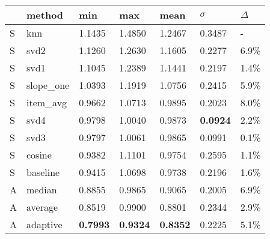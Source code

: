 \begin{table}
  \begin{tabular*}{0.9\textwidth}{ l p{1.8cm} l l l l l }
    \hline
    { } & method & min & max & mean & $\sigma$ & $\Delta$ \\
    \hline
    S & knn       	  & 1.1435	& 1.4850	& 1.2467	& 0.3487 & - \\
    S & svd2          & 1.1260	& 1.2630	& 1.1605	& 0.2277 & 6.9\% \\
    S & svd1          & 1.1045	& 1.2389	& 1.1441	& 0.2197 & 1.4\% \\
    S & slope\_one    & 1.0393	& 1.1919	& 1.0756	& 0.2415 & 5.9\% \\
    S & item\_avg     & 0.9662	& 1.0713	& 0.9895	& 0.2023 & 8.0\% \\
    S & svd4          & 0.9798	& 1.0040	& 0.9873	& \textbf{0.0924} & 2.2\% \\
    S & svd3          & 0.9797	& 1.0061	& 0.9865	& 0.0991 & 0.1\% \\
    S & cosine   	    & 0.9382	& 1.1101	& 0.9754	& 0.2595 & 1.1\% \\
    S & baseline       & 0.9415	& 1.0698	& 0.9738	& 0.2196 & 1.6\% \\
    \hline            
    A & median    	  & 0.8855	& 0.9865	& 0.9065	& 0.2005 & 6.9\% \\
    A & average    	  & 0.8519	& 0.9900	& 0.8801	& 0.2344 & 2.9\% \\
    A & adaptive       & \textbf{0.7993}	& \textbf{0.9324}	& \textbf{0.8352}	& 0.2225 & 5.1\% \\
    \hline
  \end{tabular*}
  \label{table:results:e1}
\end{table}